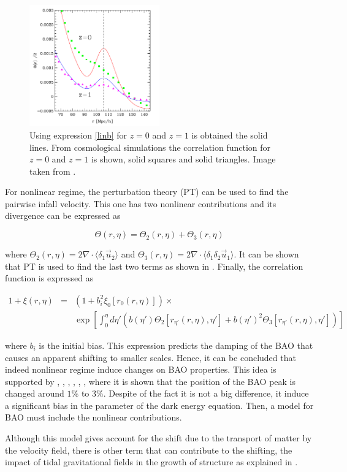 \begin{figure}[htbp]
       \centering
               \includegraphics[width=0.5\textwidth]{Images/chapter2/shift.png}
       \caption{ \small Using expression \ref{linb} for $z=0$ and $z=1$ is obtained
       the solid lines. From cosmological simulations the correlation function for $z=0$ 
       and $z=1$ is shown, solid squares and solid triangles. Image taken from \cite{motion}.}
       \label{sbao}
 \end{figure}

For nonlinear regime, the perturbation theory (PT) can be used to find the pairwise infall 
velocity. This one has two nonlinear contributions and its divergence can be expressed as 

\begin{equation}
\Theta(r,\eta) = \Theta_2(r,\eta)+ \Theta_3(r,\eta)\nonumber
\end{equation}

where $\Theta_2(r,\eta)=2\nabla \cdot \langle \delta_1 \vec{u}_2 \rangle$ and 
$\Theta_3(r,\eta)=2\nabla \cdot \langle \delta_1\delta_2 \vec{u}_1 \rangle$. It
can be shown that PT is used to find the last two terms as shown in \cite{motion}. 
Finally, the correlation function is expressed as 

\begin{eqnarray}
1 + \xi(r,\eta) &=& (1+b_i^2\xi_0[r_0(r,\eta)])\times \nonumber \\   & &\exp\left[\int_0^\eta d\eta'( b(\eta') \Theta_2[r_{\eta'}(r,\eta),\eta'] 
+ b(\eta')^2\Theta_3[r_{\eta'}(r,\eta), \eta'] )\right]
\end{eqnarray}


where $b_i$ is the initial bias. This expression predicts the damping of the BAO 
that causes an apparent shifting to smaller scales. 
Hence, it can be concluded that indeed nonlinear regime induce changes on BAO properties.
This idea is supported by \cite{motion}, \cite{uno}, \cite{dos}, \cite{tres}, \cite{cuatro},
\cite{crocce}, where it is shown that the position of the BAO peak is changed 
around $1\%$ to $3\%$. Despite of the fact it is not a big difference, it induce a significant
bias in the parameter of the dark energy equation. Then, a model for BAO must include
the nonlinear contributions. 

Although this model gives account for the shift due to the transport of matter by the velocity
field, there is other term that can contribute to the shifting, the impact of tidal gravitational 
fields in the growth of structure as explained in \cite{crocce}.
 
 
